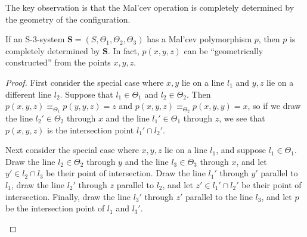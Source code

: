 The key observation is that the Mal'cev operation is completely determined by the geometry of the configuration.

\begin{lem} If an S-3-system $\mathbf{S} = (S,\Theta_1,\Theta_2,\Theta_3)$ has a Mal'cev polymorphism $p$, then $p$ is completely determined by $\mathbf{S}$. In fact, $p(x,y,z)$ can be ``geometrically constructed'' from the points $x,y,z$.
\end{lem}
\begin{proof} First consider the special case where $x,y$ lie on a line $l_1$ and $y,z$ lie on a different line $l_2$. Suppose that $l_1 \in \Theta_1$ and $l_2 \in \Theta_2$. Then $p(x,y,z) \equiv_{\Theta_1} p(y,y,z) = z$ and $p(x,y,z) \equiv_{\Theta_2} p(x,y,y) = x$, so if we draw the line $l_2' \in \Theta_2$ through $x$ and the line $l_1' \in \Theta_1$ through $z$, we see that $p(x,y,z)$ is the intersection point $l_1' \cap l_2'$.

\begin{center}
\end{center}

Next consider the special case where $x,y,z$ lie on a line $l_1$, and suppose $l_1 \in \Theta_1$. Draw the line $l_2 \in \Theta_2$ through $y$ and the line $l_3 \in \Theta_3$ through $x$, and let $y' \in l_2 \cap l_3$ be their point of intersection. Draw the line $l_1'$ through $y'$ parallel to $l_1$, draw the line $l_2'$ through $z$ parallel to $l_2$, and let $z' \in l_1' \cap l_2'$ be their point of intersection. Finally, draw the line $l_3'$ through $z'$ parallel to the line $l_3$, and let $p$ be the intersection point of $l_1$ and $l_3'$.

\begin{center}
\end{center}


\end{proof}
